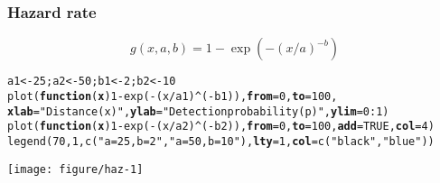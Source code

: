 \documentclass[color=usenames,dvipsnames]{beamer}\usepackage[]{graphicx}\usepackage[]{xcolor}
\makeatletter
\newcommand{\hlnum}[1]{\textcolor[rgb]{0.69,0.494,0}{#1}}%
\newcommand{\hlstr}[1]{\textcolor[rgb]{0.749,0.012,0.012}{#1}}%
\newcommand{\hlopt}[1]{\textcolor[rgb]{0,0,0}{#1}}%
\newcommand{\hlstd}[1]{\textcolor[rgb]{0,0,0}{#1}}%
\newcommand{\hlkwa}[1]{\textcolor[rgb]{0,0,0}{\textbf{#1}}}%
\newcommand{\hlkwb}[1]{\textcolor[rgb]{0,0.341,0.682}{#1}}%
\newcommand{\hlkwc}[1]{\textcolor[rgb]{0,0,0}{\textbf{#1}}}%
\newcommand{\hlkwd}[1]{\textcolor[rgb]{0.004,0.004,0.506}{#1}}%
\newenvironment{kframe}{%
 \def\at@end@of@kframe{}%
 \ifinner\ifhmode%
  \def\at@end@of@kframe{\end{minipage}}%
  \begin{minipage}{\columnwidth}%
 \fi\fi%
 \def\FrameCommand##1{\hskip\@totalleftmargin \hskip-\fboxsep
 \colorbox{shadecolor}{##1}\hskip-\fboxsep
     \hskip-\linewidth \hskip-\@totalleftmargin \hskip\columnwidth}%
 \MakeFramed {\advance\hsize-\width
   \@totalleftmargin\z@ \linewidth\hsize
   \@setminipage}}%
 {\par\unskip\endMakeFramed%
 \at@end@of@kframe}
\newenvironment{knitrout}{}{} %
\makeatother
\begin{document}
\begin{frame}[fragile]
  \frametitle{Hazard rate}
  \footnotesize
  \[
    g(x,a,b) = 1-\exp(-(x/a)^{-b})
  \]
  \vspace{-12pt}
  \centering
\begin{knitrout}\scriptsize
{}\color{fgcolor}\begin{kframe}
\begin{alltt}
\hlstd{a1} \hlkwb{<-} \hlnum{25}\hlstd{; a2} \hlkwb{<-} \hlnum{50}\hlstd{; b1} \hlkwb{<-} \hlnum{2}\hlstd{; b2} \hlkwb{<-} \hlnum{10}
\hlkwd{plot}\hlstd{(}\hlkwa{function}\hlstd{(}\hlkwc{x}\hlstd{)} \hlnum{1}\hlopt{-}\hlkwd{exp}\hlstd{(}\hlopt{-}\hlstd{(x}\hlopt{/}\hlstd{a1)}\hlopt{^}\hlstd{(}\hlopt{-}\hlstd{b1)),} \hlkwc{from}\hlstd{=}\hlnum{0}\hlstd{,} \hlkwc{to}\hlstd{=}\hlnum{100}\hlstd{,}
     \hlkwc{xlab}\hlstd{=}\hlstr{"Distance (x)"}\hlstd{,} \hlkwc{ylab}\hlstd{=}\hlstr{"Detection probability (p)"}\hlstd{,} \hlkwc{ylim}\hlstd{=}\hlnum{0}\hlopt{:}\hlnum{1}\hlstd{)}
\hlkwd{plot}\hlstd{(}\hlkwa{function}\hlstd{(}\hlkwc{x}\hlstd{)} \hlnum{1}\hlopt{-}\hlkwd{exp}\hlstd{(}\hlopt{-}\hlstd{(x}\hlopt{/}\hlstd{a2)}\hlopt{^}\hlstd{(}\hlopt{-}\hlstd{b2)),} \hlkwc{from}\hlstd{=}\hlnum{0}\hlstd{,} \hlkwc{to}\hlstd{=}\hlnum{100}\hlstd{,} \hlkwc{add}\hlstd{=}\hlnum{TRUE}\hlstd{,} \hlkwc{col}\hlstd{=}\hlnum{4}\hlstd{)}
\hlkwd{legend}\hlstd{(}\hlnum{70}\hlstd{,} \hlnum{1}\hlstd{,} \hlkwd{c}\hlstd{(}\hlstr{"a=25, b=2"}\hlstd{,} \hlstr{"a=50, b=10"}\hlstd{),} \hlkwc{lty}\hlstd{=}\hlnum{1}\hlstd{,} \hlkwc{col}\hlstd{=}\hlkwd{c}\hlstd{(}\hlstr{"black"}\hlstd{,}\hlstr{"blue"}\hlstd{))}
\end{alltt}
\end{kframe}

{\centering \texttt{[image: figure/haz-1]} 

}


\end{knitrout}
\end{frame}
\end{document}
